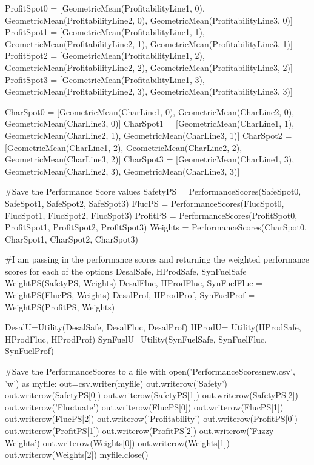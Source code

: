 \documentclass[12pt]{UIdahoMastersThesis}
\begin{document}
ProfitSpot0 =  [GeometricMean(ProfitabilityLine1, 0), GeometricMean(ProfitabilityLine2, 0), GeometricMean(ProfitabilityLine3, 0)]
ProfitSpot1  = [GeometricMean(ProfitabilityLine1, 1), GeometricMean(ProfitabilityLine2, 1), GeometricMean(ProfitabilityLine3, 1)]
ProfitSpot2  = [GeometricMean(ProfitabilityLine1, 2), GeometricMean(ProfitabilityLine2, 2), GeometricMean(ProfitabilityLine3, 2)]
ProfitSpot3  = [GeometricMean(ProfitabilityLine1, 3), GeometricMean(ProfitabilityLine2, 3), GeometricMean(ProfitabilityLine3, 3)]

CharSpot0 =  [GeometricMean(CharLine1, 0), GeometricMean(CharLine2, 0), GeometricMean(CharLine3, 0)]
CharSpot1  = [GeometricMean(CharLine1, 1), GeometricMean(CharLine2, 1), GeometricMean(CharLine3, 1)]
CharSpot2  = [GeometricMean(CharLine1, 2), GeometricMean(CharLine2, 2), GeometricMean(CharLine3, 2)]
CharSpot3  = [GeometricMean(CharLine1, 3), GeometricMean(CharLine2, 3), GeometricMean(CharLine3, 3)]

\#Save the Performance Score values
SafetyPS = PerformanceScores(SafeSpot0, SafeSpot1, SafeSpot2, SafeSpot3)
FlucPS = PerformanceScores(FlucSpot0, FlucSpot1, FlucSpot2, FlucSpot3)
ProfitPS = PerformanceScores(ProfitSpot0, ProfitSpot1, ProfitSpot2, ProfitSpot3)
Weights = PerformanceScores(CharSpot0, CharSpot1, CharSpot2, CharSpot3)



\#I am passing in the performance scores and returning the weighted performance scores for each of the options
DesalSafe, HProdSafe, SynFuelSafe = WeightPS(SafetyPS, Weights)
DesalFluc, HProdFluc, SynFuelFluc = WeightPS(FlucPS, Weights)
DesalProf, HProdProf, SynFuelProf = WeightPS(ProfitPS, Weights)

DesalU=Utility(DesalSafe, DesalFluc, DesalProf)
HProdU= Utility(HProdSafe, HProdFluc, HProdProf)
SynFuelU=Utility(SynFuelSafe, SynFuelFluc, SynFuelProf)

\#Save the PerformanceScores to a file
with open('PerformanceScoresnew.csv', 'w') as myfile:
    out=csv.writer(myfile)
    out.writerow('Safety')
    out.writerow(SafetyPS[0])
    out.writerow(SafetyPS[1])
    out.writerow(SafetyPS[2])
    out.writerow('Fluctuate')
    out.writerow(FlucPS[0])
    out.writerow(FlucPS[1])
    out.writerow(FlucPS[2])
    out.writerow('Profitability')
    out.writerow(ProfitPS[0])
    out.writerow(ProfitPS[1])
    out.writerow(ProfitPS[2])
    out.writerow('Fuzzy Weights')
    out.writerow(Weights[0])
    out.writerow(Weights[1])
    out.writerow(Weights[2])
myfile.close()
\end{document}
